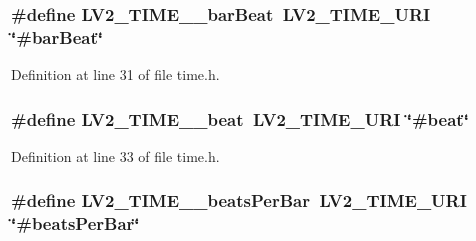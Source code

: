 \subsubsection[{\texorpdfstring{L\+V2\+\_\+\+T\+I\+M\+E\+\_\+\+\_\+bar\+Beat}{LV2_TIME__barBeat}}]{\setlength{\rightskip}{0pt plus 5cm}\#define L\+V2\+\_\+\+T\+I\+M\+E\+\_\+\+\_\+bar\+Beat~{\bf L\+V2\+\_\+\+T\+I\+M\+E\+\_\+\+U\+RI} \char`\"{}\#bar\+Beat\char`\"{}}\hypertarget{lib-src_2lv2_2lv2_2lv2_2lv2plug_8in_2ns_2ext_2time_2time_8h_a7abb1da580ce2bfa32b9709716ccc766}{}\label{lib-src_2lv2_2lv2_2lv2_2lv2plug_8in_2ns_2ext_2time_2time_8h_a7abb1da580ce2bfa32b9709716ccc766}


Definition at line 31 of file time.\+h.

\subsubsection[{\texorpdfstring{L\+V2\+\_\+\+T\+I\+M\+E\+\_\+\+\_\+beat}{LV2_TIME__beat}}]{\setlength{\rightskip}{0pt plus 5cm}\#define L\+V2\+\_\+\+T\+I\+M\+E\+\_\+\+\_\+beat~{\bf L\+V2\+\_\+\+T\+I\+M\+E\+\_\+\+U\+RI} \char`\"{}\#beat\char`\"{}}\hypertarget{lib-src_2lv2_2lv2_2lv2_2lv2plug_8in_2ns_2ext_2time_2time_8h_a3b2460fab5f923d6d3adda990859b507}{}\label{lib-src_2lv2_2lv2_2lv2_2lv2plug_8in_2ns_2ext_2time_2time_8h_a3b2460fab5f923d6d3adda990859b507}


Definition at line 33 of file time.\+h.

\subsubsection[{\texorpdfstring{L\+V2\+\_\+\+T\+I\+M\+E\+\_\+\+\_\+beats\+Per\+Bar}{LV2_TIME__beatsPerBar}}]{\setlength{\rightskip}{0pt plus 5cm}\#define L\+V2\+\_\+\+T\+I\+M\+E\+\_\+\+\_\+beats\+Per\+Bar~{\bf L\+V2\+\_\+\+T\+I\+M\+E\+\_\+\+U\+RI} \char`\"{}\#beats\+Per\+Bar\char`\"{}}\hypertarget{lib-src_2lv2_2lv2_2lv2_2lv2plug_8in_2ns_2ext_2time_2time_8h_ac5c6851b91ba48c3b570c25abeb7ea1c}{}\label{lib-src_2lv2_2lv2_2lv2_2lv2plug_8in_2ns_2ext_2time_2time_8h_ac5c6851b91ba48c3b570c25abeb7ea1c}



